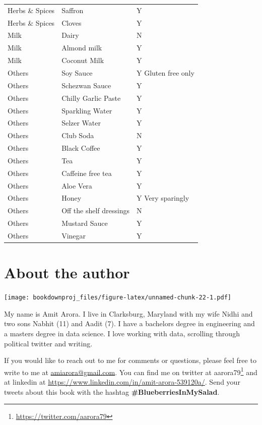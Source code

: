 \documentclass[
  oneside]{book}
\DeclareRobustCommand{\href}[2]{#2\footnote{\url{#1}}}
\begin{document}
\begin{longtable}[t]{lll}
Herbs \& Spices & Saffron & Y\\
\addlinespace
Herbs \& Spices & Cloves & Y\\
Milk & Dairy & N\\
Milk & Almond milk & Y\\
Milk & Coconut Milk & Y\\
Others & Soy Sauce & Y
Gluten free only\\
\addlinespace
Others & Schezwan Sauce & Y\\
Others & Chilly Garlic Paste & Y\\
Others & Sparkling Water & Y\\
Others & Selzer Water & Y\\
Others & Club Soda & N\\
\addlinespace
Others & Black Coffee & Y\\
Others & Tea & Y\\
Others & Caffeine free tea & Y\\
Others & Aloe Vera & Y\\
Others & Honey & Y
Very sparingly\\
\addlinespace
Others & Off the shelf dressings & N\\
Others & Mustard Sauce & Y\\
Others & Vinegar & Y\\*
\end{longtable}

\hypertarget{about-the-author}{%
\chapter{About the author}\label{about-the-author}}

\texttt{[image: bookdownproj\_files/figure-latex/unnamed-chunk-22-1.pdf]}

My name is Amit Arora. I live in Clarksburg, Maryland with my wife Nidhi and two sons Nabhit (11) and Aadit (7). I have a bachelors degree in engineering and a masters degree in data science. I love working with data, scrolling through political twitter and writing.

If you would like to reach out to me for comments or questions, please feel free to write to me at \url{amiarora@gmail.com}. You can find me on twitter at \href{https://twitter.com/aarora79}{aarora79} and at linkedin at \url{https://www.linkedin.com/in/amit-arora-539120a/}. Send your tweets about this book with the hashtag \textbf{\#BlueberriesInMySalad}.
\end{document}

